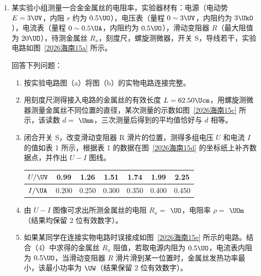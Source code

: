 \documentclass[\gkver]{gaokaozhenti}
\begin{document}
\begin{enumerate}
{1 滴溶液中纯油酸的体积：$V=\frac{1 \UmL}{500}\times\frac{1}{200}=1\times10^{-5} \UmL=1\times10^{-11} \Umc$。

分子直径 $d=\frac{V}{S}=\frac{1\times10^{-11}}{1.3\times10^{-2}} \Um \approx 8\times10^{-10} \Um$。

（4）分子直径计算公式为 $d=\frac{V}{S}$，若油膜未完全散开，测得的面积 $S$ 偏小，计算得到的直径 $d$ 会偏大。
}

\item
某实验小组测量一合金金属丝的电阻率，实验器材有：电源（电动势 $E = 3 \UV$，内阻 $r$ 约为 $0.5 \UO$），电压表（量程 $0 \sim 3 \UV$，内阻约为 $3 \UkO$），电流表（量程 $0 \sim 0.5 \UA$，内阻约为 $0.5 \UO$），滑动变阻器 $R$（最大阻值为 $20 \UO$），待测金属丝 $R_{x}$，刻度尺，螺旋测微器，开关 S，导线若干，实验电路如图~\ref{2026海南15a} 所示。

回答下列问题：
\begin{enumerate}
	\item
	按实验电路图（a）将图（b）的实物电路连接完整。
	\item
	用刻度尺测得接入电路的金属丝的有效长度 $L = 62.50 \Ucm$，用螺旋测微器测量金属丝不同位置的直径，某次测量的示数如图~\ref{2026海南15c} 所示，该读数 $d =$  $\Umm$，三次测量后得到的平均值恰好与 $d$ 相等。
	\item
	闭合开关 S，改变滑动变阻器 R 滑片的位置，测得多组电压 $U$ 和电流 $I$ 的值如表 1 所示，根据表 1 的数据在图~\ref{2026海南15d} 的坐标纸上补齐数据点，并作出 $U-I$ 图线。

	\begin{center}
	\begin{tabular}{|c|c|c|c|c|c|c|}
	\hline
	$U/\UV$ & 0.99 & 1.26 & 1.51 & 1.74 & 1.99 & 2.25 \\
	\hline
	$I/\UA$ & 0.200 & 0.250 & 0.300 & 0.350 & 0.400 & 0.450 \\
	\hline
	\end{tabular}
	\end{center}
	\item
	由 $U-I$ 图像可求出所测金属丝的电阻 $R_{x} =$  $\UO$，电阻率 $\rho =$  $\UOm$（结果均保留 2 位有效数字）。
	\item
	如果某同学在连接实物电路时误接成如图~\ref{2026海南15e} 所示的电路。结合（4）中求得的金属丝 $R_{x}$ 阻值，若取电源内阻为 $0.5 \UO$，电流表内阻为 $0.5 \UO$，当滑动变阻器 $R$ 滑片滑到某一位置时，金属丝发热功率最小，该最小功率为  $\UW$（结果保留 2 位有效数字）。
\end{enumerate}


\end{enumerate}
\end{document}
